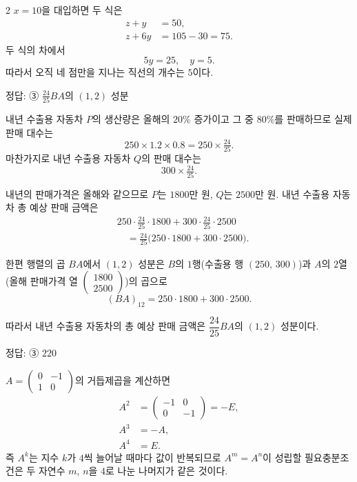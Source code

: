 \documentclass[10pt]{article}
\begin{document}
\begin{multicols}{2}
$x = 10$을 대입하면 두 식은
\begin{align*}
z + y &= 50, \\
z + 6y &= 105 - 30 = 75.
\end{align*}
두 식의 차에서
\[ 5y = 25,\quad y = 5. \]
따라서 오직 네 점만을 지나는 직선의 개수는 $5$이다.

\begin{answerbox}정답: ③ $\tfrac{24}{25}BA$의 $(1,2)$ 성분\end{answerbox}

내년 수출용 자동차 $P$의 생산량은 올해의 $20\%$ 증가이고 그 중 $80\%$를 판매하므로 실제 판매 대수는
\[ 250 \times 1.2 \times 0.8 = 250 \times \tfrac{24}{25}. \]
마찬가지로 내년 수출용 자동차 $Q$의 판매 대수는
\[ 300 \times \tfrac{24}{25}. \]

내년의 판매가격은 올해와 같으므로 $P$는 $1800$만 원, $Q$는 $2500$만 원. 내년 수출용 자동차 총 예상 판매 금액은
\begin{align*}
&250 \cdot \tfrac{24}{25} \cdot 1800 + 300 \cdot \tfrac{24}{25} \cdot 2500 \\
&\quad = \tfrac{24}{25}\bigl(250 \cdot 1800 + 300 \cdot 2500\bigr).
\end{align*}

한편 행렬의 곱 $BA$에서 $(1, 2)$ 성분은 $B$의 $1$행(수출용 행 $(250,\,300)$)과 $A$의 $2$열(올해 판매가격 열 $\begin{pmatrix} 1800 \\ 2500 \end{pmatrix}$)의 곱으로
\[ (BA)_{12} = 250 \cdot 1800 + 300 \cdot 2500. \]

따라서 내년 수출용 자동차의 총 예상 판매 금액은 $\dfrac{24}{25} BA$의 $(1, 2)$ 성분이다.

\begin{answerbox}정답: ③ $220$\end{answerbox}

$A = \begin{pmatrix} 0 & -1 \\ 1 & 0 \end{pmatrix}$의 거듭제곱을 계산하면
\begin{align*}
A^2 &= \begin{pmatrix} -1 & 0 \\ 0 & -1 \end{pmatrix} = -E, \\
A^3 &= -A, \\
A^4 &= E.
\end{align*}
즉 $A^k$는 지수 $k$가 $4$씩 늘어날 때마다 값이 반복되므로 $A^m = A^n$이 성립할 필요충분조건은 두 자연수 $m$, $n$을 $4$로 나눈 나머지가 같은 것이다.


\end{multicols}
\end{document}
